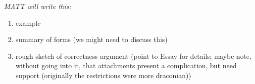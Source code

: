 {\it \color{red} MATT will write this:

\begin{enumerate}

\item example
\item summary of forms (we might need to discuss this)
\item rough sketch of correctness argument (point to Essay for
  details; maybe note, without going into it, that attachments present
  a complication, but need support (originally the restrictions were
  more draconian))

\end{enumerate}
}
